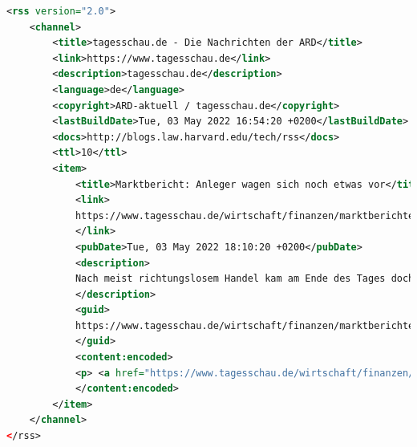 \begin{lstlisting}[title=Tagesschau RSS Feed,language=xml]
<rss version="2.0">
    <channel>
        <title>tagesschau.de - Die Nachrichten der ARD</title>
        <link>https://www.tagesschau.de</link>
        <description>tagesschau.de</description>
        <language>de</language>
        <copyright>ARD-aktuell / tagesschau.de</copyright>
        <lastBuildDate>Tue, 03 May 2022 16:54:20 +0200</lastBuildDate>
        <docs>http://blogs.law.harvard.edu/tech/rss</docs>
        <ttl>10</ttl>
        <item>
            <title>Marktbericht: Anleger wagen sich noch etwas vor</title>
            <link>
            https://www.tagesschau.de/wirtschaft/finanzen/marktberichte/boerse-marktbericht-dax-dow-jones-101.html
            </link>
            <pubDate>Tue, 03 May 2022 18:10:20 +0200</pubDate>
            <description>
            Nach meist richtungslosem Handel kam am Ende des Tages doch noch etwas Interesse auf. Die Anleger warten derweil mit Spannung auf die Ergebnisse der Zinssitzung der US-Notenbank.
            </description>
            <guid>
            https://www.tagesschau.de/wirtschaft/finanzen/marktberichte/boerse-marktbericht-dax-dow-jones-101.html
            </guid>
            <content:encoded>
            <p> <a href="https://www.tagesschau.de/wirtschaft/finanzen/marktberichte/boerse-marktbericht-dax-dow-jones-101.html"><img src="https://www.tagesschau.de/multimedia/bilder/boerse-frankfurt-141~_v-mittel16x9.jpg"/></a> <br/> <br/> Nach meist richtungslosem Handel kam am Ende des Tages doch noch etwas Interesse auf. Die Anleger warten derweil mit Spannung auf die Ergebnisse der Zinssitzung der US-Notenbank. <a href="https://www.tagesschau.de/wirtschaft/finanzen/marktberichte/boerse-marktbericht-dax-dow-jones-101.html">mehr</a> </p> <ul> </ul> </p> <p><a href="https://www.tagesschau.de/wirtschaft/finanzen/marktberichte/boerse-marktbericht-dax-dow-jones-101.html">Meldung bei www.tagesschau.de lesen</a></p>
            </content:encoded>
        </item>
    </channel>
</rss>
\end{lstlisting}
